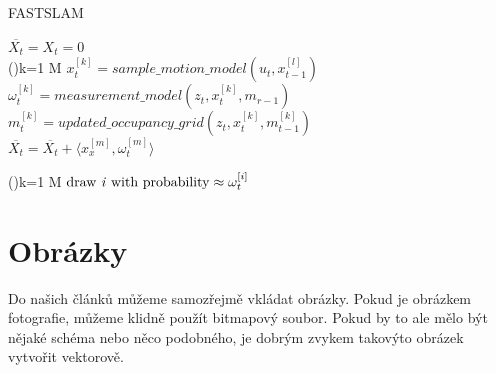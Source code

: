 \documentclass[a4paper,11pt, hidelinks]{article}
\begin{document}
\begin{algorithm}
\caption{F{\footnotesize AST}SLAM}
\label{algo:1}
\SetAlgoNoLine
\SetNlSty{}{}{:\enspace}


\Indp

\BlankLine

$\overline{X_t} = X_t = 0$ \\
\For(){k=1  M}{
    $x_t^{[k]} = sample\_motion\_model(u_t,x_{t-1}^{[l]})$ \\
    $\omega_t^{[k]} = measurement\_model(z_t,x_t^{[k]},m_{r-1})$ \\
    $m_t^{[k]} = updated\_occupancy\_grid(z_t,x_t^{[k]},m_{t-1}^{[k]})$ \\
    $\overline{X_t} = \overline{X_t} + \langle x_x^{[m]}, \omega_t^{[m]} \rangle$
}

\For(){k=1  M}{
    $\mbox{draw \emph{i} with probability} \approx \omega_t^{[i]}$ \\
}

\end{algorithm}

\section{Obrázky}
Do našich článků můžeme samozřejmě vkládat obrázky. Pokud je obrázkem fotografie, můžeme klidně použít bitmapový soubor. Pokud by to ale mělo být nějaké schéma nebo něco podobného, je dobrým zvykem takovýto obrázek vytvořit vektorově.
\end{document}
